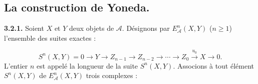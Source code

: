 \subsection{La construction de Yoneda.}

\noindent\textbf{3.2.1.}\quad
Soient $X$ et $Y$ deux objets de $\mathcal A$. Désignons par
$E_{\mathcal A}^{n}(X,Y)$ ($n\geq1$) l'ensemble des suites exactes :

\[
S^n(X,Y)=0\longrightarrow Y\longrightarrow Z_{n-1}
\longrightarrow Z_{n-2}\longrightarrow\cdots\longrightarrow Z_0
\xrightarrow{u_0}X\longrightarrow0.
\]
L'entier $n$ est appelé la longueur de la suite $S^n(X,Y)$. Associons à tout
élément $S^n(X,Y)$ de $E_{\mathcal A}^{n}(X,Y)$ trois complexes :
\endgroup
